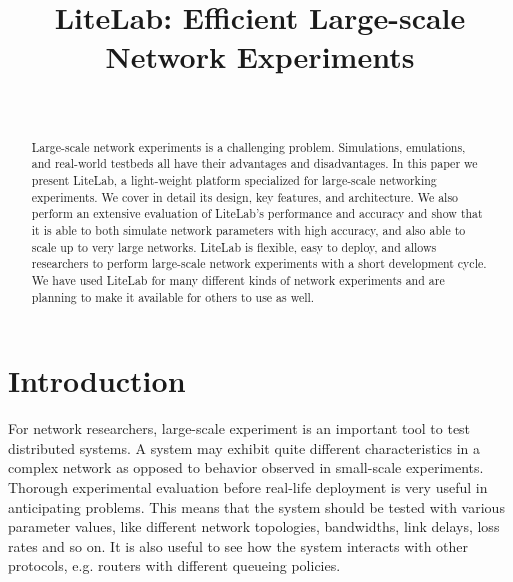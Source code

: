 \documentclass[conference]{IEEEtran}
\begin{document}
\title{LiteLab: Efficient Large-scale Network Experiments}

\author{\\
}




\maketitle
\begin{abstract}
  Large-scale network experiments is a challenging
  problem. Simulations, emulations, and real-world testbeds all have
  their advantages and disadvantages.  In this paper we present
  LiteLab, a light-weight platform specialized for large-scale
  networking experiments. We cover in detail its design, key features,
  and architecture. We also perform an extensive evaluation of
  LiteLab's performance and accuracy and show that it is able to both
  simulate network parameters with high accuracy, and also able to
  scale up to very large networks. LiteLab is flexible, easy to
  deploy, and allows researchers to perform large-scale network
  experiments with a short development cycle.  We have used LiteLab
  for many different kinds of network experiments and are planning to
  make it available for others to use as well.





\end{abstract}






\section{Introduction}
\label{sec:introduction}






For network researchers, large-scale experiment is an important tool
to test distributed systems. A system may exhibit quite different
characteristics in a complex network as opposed to behavior observed
in small-scale experiments. Thorough experimental evaluation before
real-life deployment is very useful in anticipating problems.
This means that the system should be tested with various parameter
values, like different network topologies, bandwidths, link delays,
loss rates and so on. It is also useful to see how the system
interacts with other protocols, e.g. routers with different queueing
policies.
\end{document}
